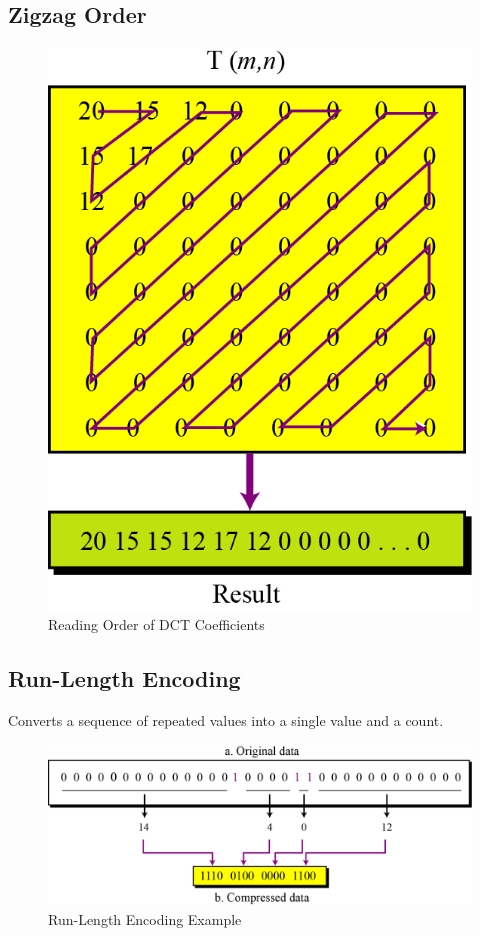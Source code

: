 \subsection*{Zigzag Order}

\begin{figure}[H]
  \centering
  \includegraphics[width=0.7\linewidth]{images/zigzag.png}
  \caption{Reading Order of DCT Coefficients}
\end{figure}


\subsection*{Run-Length Encoding}

Converts a sequence of repeated values into a single value and a count.

\begin{figure}[H]
  \centering
  \includegraphics[width=\linewidth]{images/run_length_encoding.png}
  \caption{Run-Length Encoding Example}
\end{figure}


